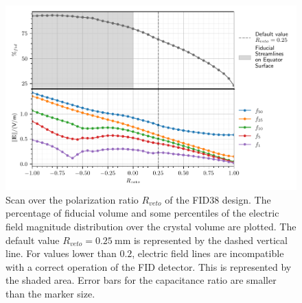 \begin{figure}
\centering
\includegraphics[scale=1]{Figures/ElectrodesScan/capacitance_fiducial_veto_ratio.pdf}
\caption{Scan over the polarization ratio $R_{veto}$ of the FID38 design. The percentage of fiducial volume and some percentiles of the electric field magnitude distribution over the crystal volume are plotted. The default value $R_{veto}=\SI{0.25}{\mm}$ is represented by the dashed vertical line. For values lower than $0.2$, electric field lines are incompatible with a correct operation of the FID detector. This is represented by the shaded area. Error bars for the capacitance ratio are smaller than the marker size.}
\label{fig:capacitance-fiducial-veto-ratio}
\end{figure}

